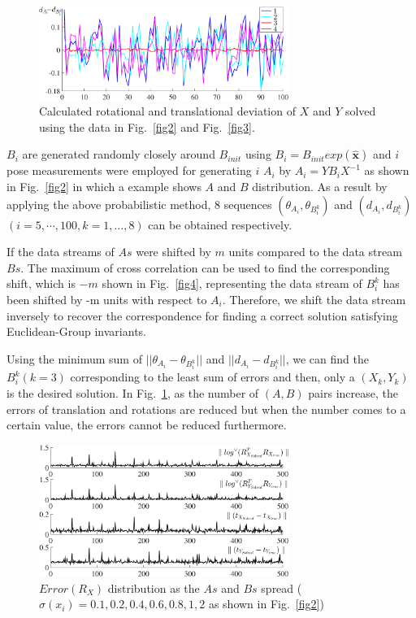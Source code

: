 \documentclass[letterpaper, 10 pt, conference]{ieeeconf}  %
\begin{document}
\begin{center}
\begin{figure}
\centering
\includegraphics[width=3.2in]{fig5.eps}
\caption{
Calculated rotational and translational deviation of $X$ and $Y$ solved using the data in Fig.~\ref{fig2} and Fig.~\ref{fig3}.
}
\label{fig5}
\end{figure}
\end{center}


$B_{i}$ are generated randomly closely around $B_{init}$ using $B_i = B_{init} exp(\mathbf{\widehat{x}})$ and $i$ pose measurements were employed for generating $i$ $A_{i}$ by $A_{i} = YB_{i}X^{-1}$ as shown in Fig.~\ref{fig2} in which a example shows $A$ and $B$ distribution. As a result by applying the above probabilistic method, 8 sequences $(\theta_{A_{i}},\theta_{B_{i}^{k}})$ and $(d_{A_{i}},d_{B_{i}^{k}})$ $ (i=5,\cdots, 100, k=1,\dots,8)$ can be obtained respectively.

If the data streams of $As$ were shifted by $m$ units compared to the data stream $Bs$. The maximum of cross correlation can be used to find the corresponding shift, which is $-m$ shown in Fig.~\ref{fig4}, representing the data stream of $B_{i}^{k}$ has been shifted by -m units with respect to ${A_{i}}$. Therefore, we shift the data stream inversely to recover the correspondence for finding a correct solution satisfying Euclidean-Group invariants.


Using the minimum sum of $||\theta_{A_{i}} - \theta_{B_{i}^{k}}||$ and $||d_{A_{i}} - d_{B_{i}^{k}}||$, we can find the ${B_{i}^{k}}(k=3)$ corresponding to the least sum of errors and then, only a $(X_k,Y_k)$ is the desired solution. In Fig.~\ref{fig5}, as the number of $(A,B)$ pairs increase, the errors of translation and rotations are reduced but when the number comes to a certain value, the errors cannot be reduced furthermore.

\begin{center}
\begin{figure}
\centering
\includegraphics[width=3.2in]{fig6.eps}
\caption{
$Error(R_X)$ distribution as the $As$ and $Bs$ spread ($\sigma(x_i) = 0.1, 0.2, 0.4, 0.6, 0.8, 1, 2$ as shown in Fig.~\ref{fig2})
}
\label{fig6}
\end{figure}
\end{center}
\end{document}
